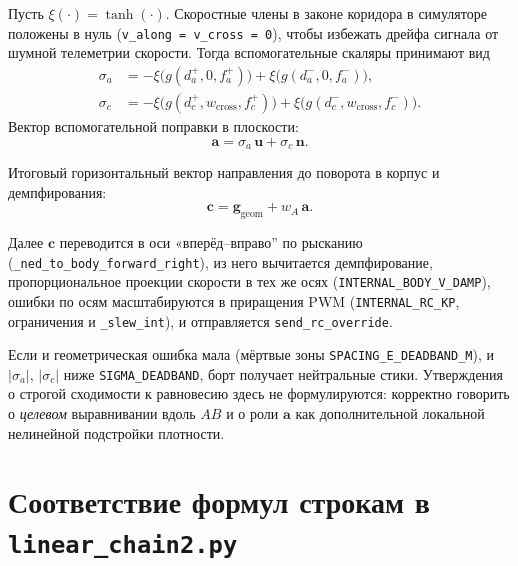 \documentclass[12pt,a4paper]{article}
\begin{document}
Пусть $\xi(\cdot) = \tanh(\cdot)$. Скоростные члены в законе коридора в симуляторе положены в нуль (\texttt{v\_along = v\_cross = 0}), чтобы избежать дрейфа сигнала от шумной телеметрии скорости. Тогда вспомогательные скаляры принимают вид
\begin{align}
  \sigma_a &= -\xi\!\bigl(g(d_a^+, 0, f_a^+)\bigr) + \xi\!\bigl(g(d_a^-, 0, f_a^-)\bigr), \\
  \sigma_c &= -\xi\!\bigl(g(d_c^+, w_{\mathrm{cross}}, f_c^+)\bigr) + \xi\!\bigl(g(d_c^-, w_{\mathrm{cross}}, f_c^-)\bigr).
\end{align}
Вектор вспомогательной поправки в плоскости:
\begin{equation}
  \mathbf{a} = \sigma_a\, \mathbf{u} + \sigma_c\, \mathbf{n}.
\end{equation}

Итоговый горизонтальный вектор направления до поворота в корпус и демпфирования:
\begin{equation}
  \mathbf{c} = \mathbf{g}_{\mathrm{geom}} + w_A\, \mathbf{a}.
\end{equation}

Далее $\mathbf{c}$ переводится в оси «вперёд--вправо'' по рысканию (\texttt{\_ned\_to\_body\_forward\_right}), из него вычитается демпфирование, пропорциональное проекции скорости в тех же осях (\texttt{INTERNAL\_BODY\_V\_DAMP}), ошибки по осям масштабируются в приращения PWM (\texttt{INTERNAL\_RC\_KP}, ограничения и \texttt{\_slew\_int}), и отправляется \texttt{send\_rc\_override}.

Если и геометрическая ошибка мала (мёртвые зоны \texttt{SPACING\_E\_DEADBAND\_M}), и $|\sigma_a|$, $|\sigma_c|$ ниже \texttt{SIGMA\_DEADBAND}, борт получает нейтральные стики. Утверждения о строгой сходимости к равновесию здесь не формулируются: корректно говорить о \emph{целевом} выравнивании вдоль $AB$ и о роли $\mathbf{a}$ как дополнительной локальной нелинейной подстройки плотности.

\section{Соответствие формул строкам в \texttt{linear\_chain2.py}}
\end{document}
